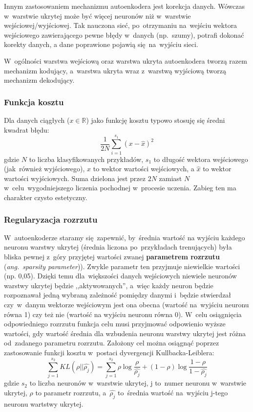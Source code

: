 Innym zastosowaniem mechanizmu autoenkodera jest korekcja danych. Wówczas w~warstwie ukrytej
może być więcej neuronów niż w~warstwie wejściowej/wyjściowej. Tak nauczona sieć, po~otrzymaniu na~wejściu
wektora wejściowego zawierającego pewne błędy w~danych (np.~szumy), potrafi dokonać korekty danych,
a dane poprawione pojawią się~na~wyjściu sieci.

W~ogólności warstwa wejściową oraz warstwa ukryta autoenkodera tworzą razem mechanizm kodujący, a~warstwa ukryta wraz
z~warstwą wyjściową tworzą mechanizm dekodujący.

\subsubsection{Funkcja kosztu}
Dla danych ciągłych ($x\in\mathbb{R}$) jako funkcję kosztu typowo stosuję się średni kwadrat błędu:
\begin{equation*}
\frac{1}{2N}\sum\limits_{i=1}^{s_1}(x-\hat{x})^2
\end{equation*}
gdzie $N$ to liczba klasyfikowanych przykładów, $s_1$ to długość wektora wejściowego (jak~również wyjściowego),
$x$ to wektor wartości wejściowych, a $\hat{x}$ to wektor wartości wyjściowych. Suma dzielona jest przez $2N$ zamiast
$N$ w~celu~wygodniejszego liczenia pochodnej w~procesie uczenia. Zabieg ten ma charakter czysto estetyczny.

\subsubsection{Regularyzacja rozrzutu}
W~autoenkoderze staramy się~zapewnić, by~średnia wartość na wyjściu każdego neuronu warstwy ukrytej
(średnia liczona po~przykładach trenujących) była bliska pewnej z~góry przyjętej wartości zwanej \textbf{parametrem
rozrzutu} (\textit{ang.~sparsity parameter})). Zwykle parametr ten przyjmuje niewielkie wartości (np. 0,05). Dzięki temu
dla~większości danych wejściowych niewiele neuronów warstwy ukrytej będzie ,,aktywowanych'', a~więc każdy neuron będzie
rozpoznawał jedną wybraną zależność pomiędzy danymi i~będzie stwierdzał czy~w~danym wektorze wejściowym jest ona obecna
(wartość na~wyjściu neuronu równa 1) czy też nie (wartość na wyjściu neuronu równa 0). W~celu osiągnięcia odpowiedniego
rozrzutu funkcja celu musi przyjmować odpowienio wyższe wartości, gdy wartość średnia dla wzbudenia neuronu warstwy
ukrytej jest różna od~zadanego parametru rozrzutu. Założony cel można osiągnąć poprzez zastosowanie funkcji kosztu
w~postaci dyvergencji Kullbacka-Leiblera:
\begin{equation*}
\sum\limits_{j=1}^{s_2}KL(\rho||\hat{\rho_j}) = \sum\limits_{j=1}^{s_2}\rho \log\frac{\rho}{\hat{\rho_j}} +
(1-\rho)\log\frac{1-\rho}{1-\hat{\rho_j}}
\end{equation*}
gdzie $s_2$ to liczba neuronów w~warstwie ukrytej, j to~numer neuronu w~warstwie ukrytej, $\rho$ to parametr rozrzutu,
a~$\hat{\rho_j}$ to~średnia wartość na~wyjściu j-tego neuronu wartstwy ukrytej.

